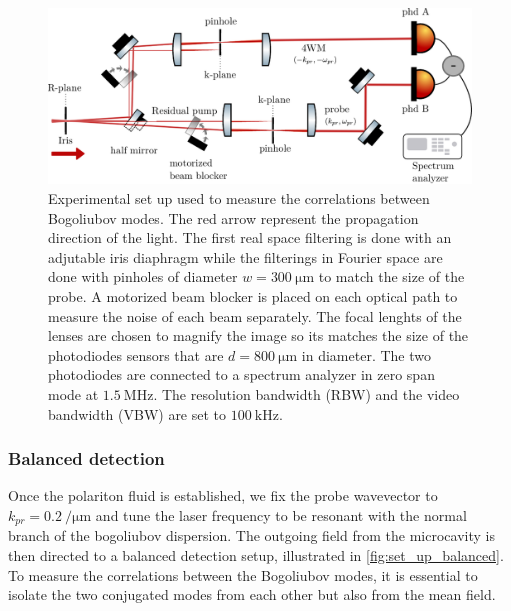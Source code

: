 \begin{figure}
    \centering
    \includegraphics[width=1\textwidth]{chap_correlation/fig/half_mirror.pdf}
    \caption{Experimental set up used to measure the correlations between Bogoliubov modes. The red arrow represent the propagation direction of the light.
    The first real space filtering is done with an adjutable iris diaphragm while the filterings in Fourier space are done with pinholes of diameter $w=\SI{300}{\micro\meter}$ to match the size of the 
    probe. A motorized beam blocker is placed on each optical path to measure the noise of each beam separately. The focal lenghts of the lenses are chosen to magnify the image so its matches the size of the photodiodes sensors that are $d=\SI{800}{\micro\meter}$ in diameter. The two photodiodes are connected to a spectrum analyzer in zero span mode at $\SI{1.5}{\mega\hertz}$. The resolution bandwidth (RBW) and the video bandwidth (VBW) are set to $\SI{100}{\kilo\hertz}$.}
    \label{fig:set_up_balanced}
\end{figure}

\subsubsection{Balanced detection}
Once the polariton fluid is established, we fix the probe wavevector to $k_{pr}=\SI{0.2}{\per\micro\meter}$ and tune the laser frequency to be resonant with the normal branch of the bogoliubov dispersion. The outgoing field from the microcavity is then directed to a balanced detection setup, illustrated in \autoref{fig:set_up_balanced}.
To measure the correlations between the Bogoliubov modes, it is essential to isolate the two conjugated modes from each other but also from the mean field. 

\bigskip

